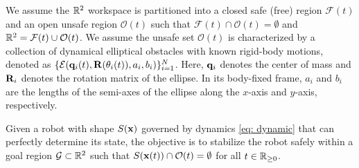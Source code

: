 
We assume the $\mathbb{R}^2$ workspace is partitioned into a closed safe (free) region $\mathcal{F}(t)$ and an open unsafe region $\mathcal{O}(t)$ such that  $\mathcal{F}(t) \cap \mathcal{O}(t) = \emptyset$ and $\mathbb{R}^2 = \mathcal{F}(t) \cup \mathcal{O}(t)$. We assume the unsafe set $\mathcal{O}(t)$ is characterized by a collection of dynamical elliptical obstacles with known rigid-body motions, denoted as $\{{\cal E}(\mathbf{q}_i(t), \mathbf{R}(\theta_i(t)), a_i, b_i)\}_{i=1}^N$. Here, $\mathbf{q}_i$ denotes the center of mass and $\mathbf{R}_i$ denotes the rotation matrix of the ellipse. In its body-fixed frame, $a_i$ and $b_i$ are the lengths of the semi-axes of the ellipse along the $x$-axis and $y$-axis, respectively.

\begin{problem*}
Given a robot with shape $S(\mathbf{x})$ governed by dynamics \eqref{eq: dynamic} that can perfectly determine its state, the objective is to stabilize the robot safely within a goal region ${\cal G} \subset \mathbb{R}^2$ such that $S(\mathbf{x}(t)) \cap {\cal O}(t) = \emptyset$ for all $t \in \mathbb{R}_{\geq 0}$.
\end{problem*}






